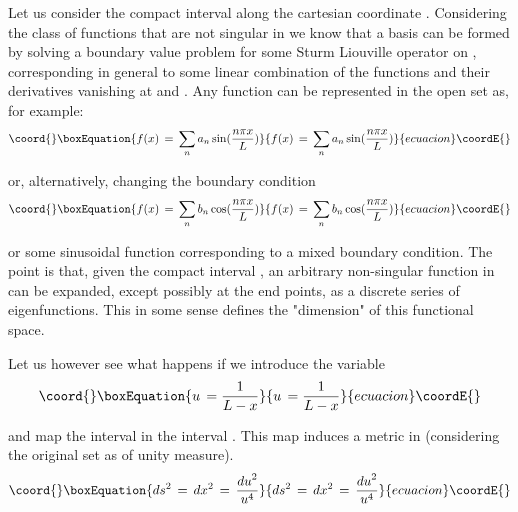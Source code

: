 \documentclass[a4paper,12pt]{article}
\begin{document}
Let us consider the compact interval 
\coordHE{} 
along the cartesian coordinate \coordHE{}.
Considering the class of functions \coordHE{} that are not 
singular in \coordHE{} we know that a basis can be formed 
 by solving a boundary value problem for some 
 Sturm Liouville operator on \coordHE{}, corresponding in general to 
some linear combination of the functions and their derivatives 
vanishing 
at \coordHE{} and \coordHE{}. Any function \coordHE{} 
can be represented in the open set \coordHE{} as, for example:
\begin{equation}\coord{}\boxEquation{
f(x)\,=\,\sum_n  a_n \sin ({n\pi x\over L}) 
}{
f(x)\,=\,\sum_n  a_n \sin ({n\pi x\over L}) 
}{ecuacion}\coordE{}\end{equation}

\noindent or, alternatively, changing the boundary condition
\begin{equation}\coord{}\boxEquation{
f(x)\,=\,\sum_n  b_n \cos ({n\pi x\over L}) 
}{
f(x)\,=\,\sum_n  b_n \cos ({n\pi x\over L}) 
}{ecuacion}\coordE{}\end{equation}

\noindent or some sinusoidal function corresponding to a mixed 
boundary condition. The point is that, given the compact interval \coordHE{},
an arbitrary non-singular function  in \coordHE{} can be expanded, 
except possibly at the
end points, as a discrete series of eigenfunctions.
This in some sense defines the "dimension" of this functional space.
 

Let us however see what happens if we  introduce the variable 
\begin{equation}\coord{}\boxEquation{
\label{map1}
u \,= {1\over L - x }
}{
u \,= {1\over L - x }
}{ecuacion}\coordE{}\end{equation}

\noindent and map the interval \coordHE{} in the interval 
\coordHE{}. This map induces a 
metric in \coordHE{} (considering the original set \coordHE{} as of unity 
measure).
\begin{equation}\coord{}\boxEquation{
\label{metric1}
ds^2 \,=\, dx^2\,=\,{{du}^2\over u^4}
}{
ds^2 \,=\, dx^2\,=\,{{du}^2\over u^4}
}{ecuacion}\coordE{}\end{equation}
\end{document}

